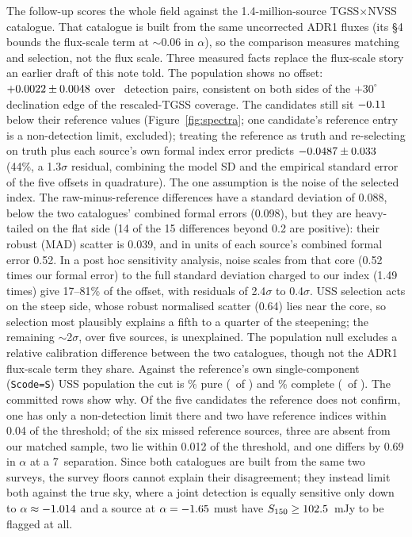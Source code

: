 \documentclass[RNAAS]{aastex631}
\newcommand{\code}[1]{\texttt{#1}}
\begin{document}
The follow-up scores the whole field against the 1.4-million-source
\citet{degasperin2018} TGSS$\times$NVSS catalogue. That catalogue is built from the
same uncorrected ADR1 fluxes (its \S4 bounds the \citealt{hurleywalker2017}
flux-scale term at $\sim$0.06 in $\alpha$), so the comparison measures matching and
selection, not the flux scale. Three measured facts replace the flux-scale story an
earlier draft of this note told. The population shows no offset:
$+0.0022\pm0.0048$ over \usRealNPairs\ detection pairs,
consistent on both sides of the $+30^\circ$ declination edge of the rescaled-TGSS coverage. The
candidates still sit $-0.11$ below their reference values
(Figure~\ref{fig:spectra}; one candidate's reference entry is a non-detection limit,
excluded); treating the reference as truth and re-selecting on truth plus each
source's own formal index error predicts $-0.0487\pm0.033$ (44\%, a
1.3$\sigma$ residual, combining the model SD and the empirical standard error of the five
offsets in quadrature). The one assumption is the noise of the selected index. The
raw-minus-reference differences have a standard deviation of 0.088, below the two catalogues'
combined formal errors (0.098), but they are heavy-tailed on the flat side (14 of the 15
differences beyond 0.2 are positive): their robust (MAD) scatter is 0.039, and in units of each
source's combined formal error 0.52. In a post hoc sensitivity analysis, noise scales from
that core (0.52 times our formal error) to the full standard deviation charged to our index
(1.49 times) give 17--81\% of the offset, with residuals of 2.4$\sigma$ to 0.4$\sigma$. USS
selection acts on the steep side, whose robust normalised scatter (0.64) lies near the core, so
selection most plausibly explains a fifth to a quarter of the steepening; the remaining
$\sim$2$\sigma$, over five sources, is unexplained. The population null excludes a relative calibration
difference between the two catalogues, though not the ADR1 flux-scale term they share.
Against the reference's own single-component (\code{Scode=S}) USS population the cut is \usRealPurityPct\% pure
(\usRealNFlaggedRefUss\ of \usNuss) and \usRealCompletenessPct\% complete
(\usRealNRefUssRec\ of \usRealNRefUss). The committed rows show why. Of the five
candidates the reference does not confirm, one has only a non-detection limit there and two
have reference indices within 0.04 of the threshold; of the six missed
reference sources, three are absent from our matched sample, two lie within 0.012 of the
threshold, and one differs by 0.69 in $\alpha$ at a 7\arcsec\ separation. Since both
catalogues are built from the same two surveys, the survey floors cannot explain their
disagreement; they instead limit both against the true sky, where a joint detection is
equally sensitive only down to $\alpha\approx-1.014$ and a source at
$\alpha=-1.65$ must have $S_{150}\geq102.5$~mJy to be flagged at all.
\end{document}
